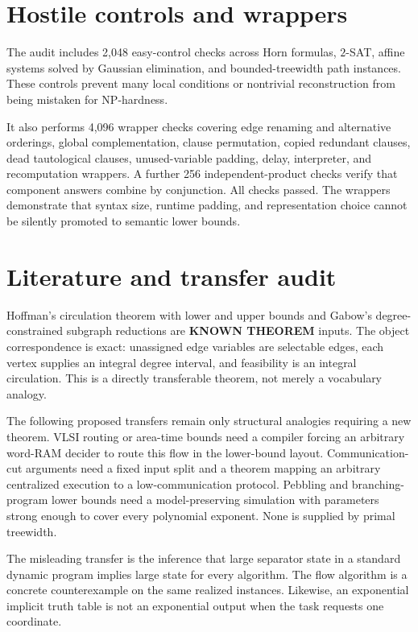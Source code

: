 \documentclass[11pt]{article}
\newcommand{\Status}[1]{\textbf{#1}}
\begin{document}
\section{Hostile controls and wrappers}

The audit includes 2,048 easy-control checks across Horn formulas, \(2\)-SAT,
affine systems solved by Gaussian elimination, and bounded-treewidth path
instances. These controls prevent many local conditions or nontrivial
reconstruction from being mistaken for NP-hardness.

It also performs 4,096 wrapper checks covering edge renaming and alternative
orderings, global complementation, clause permutation, copied redundant
clauses, dead tautological clauses, unused-variable padding, delay, interpreter,
and recomputation wrappers. A further 256 independent-product checks verify
that component answers combine by conjunction. All checks passed. The
wrappers demonstrate that syntax size, runtime padding, and representation
choice cannot be silently promoted to semantic lower bounds.

\section{Literature and transfer audit}

Hoffman's circulation theorem with lower and upper bounds and Gabow's
degree-constrained subgraph reductions are \Status{KNOWN THEOREM} inputs. The
object correspondence is exact: unassigned edge variables are selectable
edges, each vertex supplies an integral degree interval, and feasibility is
an integral circulation. This is a directly transferable theorem, not merely
a vocabulary analogy.

The following proposed transfers remain only structural analogies requiring a
new theorem. VLSI routing or area-time bounds need a compiler forcing an
arbitrary word-RAM decider to route this flow in the lower-bound layout.
Communication-cut arguments need a fixed input split and a theorem mapping an
arbitrary centralized execution to a low-communication protocol. Pebbling
and branching-program lower bounds need a model-preserving simulation with
parameters strong enough to cover every polynomial exponent. None is supplied
by primal treewidth.

The misleading transfer is the inference that large separator state in a
standard dynamic program implies large state for every algorithm. The flow
algorithm is a concrete counterexample on the same realized instances.
Likewise, an exponential implicit truth table is not an exponential output
when the task requests one coordinate.
\end{document}

